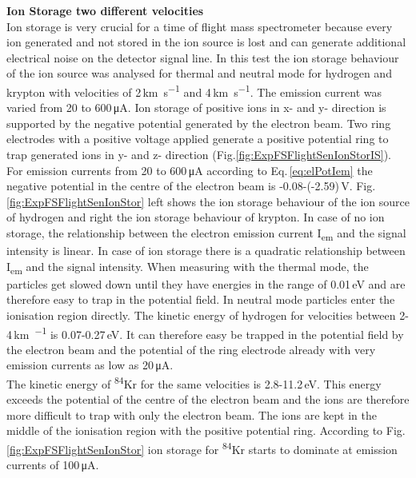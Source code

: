 		\textbf{Ion Storage two different velocities}\\ %
		Ion storage is very crucial for a time of flight mass spectrometer because every ion generated and not stored in the ion source is lost and can generate additional electrical noise on the detector signal line. In this test the ion storage behaviour of the ion source was analysed for thermal and neutral mode for hydrogen and krypton with velocities of 2\,\si{\kilo\meter\per\second} and 4\,\si{\kilo\meter\per\second}. The emission current was varied from 20 to 600\,\si{\micro\ampere}. Ion storage of positive ions in x- and y- direction is supported by the negative potential generated by the electron beam. Two ring electrodes with a positive voltage applied generate a positive potential ring to trap generated ions in y- and z- direction (Fig.\ref{fig:ExpFSFlightSenIonStorIS}). For emission currents from 20 to 600\,\si{\micro\ampere} according to Eq.\,\eqref{eq:elPotIem} the negative potential in the centre of the electron beam is -0.08-(-2.59)\,\si{\volt}. Fig.\ref{fig:ExpFSFlightSenIonStor} left shows the ion storage behaviour of the ion source of hydrogen and right the ion storage behaviour of krypton. In case of no ion storage, the relationship between the electron emission current I\textsubscript{em} and the signal intensity is linear. In case of ion storage there is a quadratic relationship between I\textsubscript{em} and the signal intensity. When measuring with the thermal mode, the particles get slowed down until they have energies in the range of 0.01\,\si{\electronvolt} and are therefore easy to trap in the potential field. In neutral mode particles enter the ionisation region directly. The kinetic energy of hydrogen for velocities between 2-4\,\si{\kilo\metre\per\sec} is 0.07-0.27\,\si{\electronvolt}. It can therefore easy be trapped in the potential field by the electron beam and the potential of the ring electrode already with very emission currents as low as 20\,\si{\micro\ampere}.\\
		The kinetic energy of \textsuperscript{84}Kr for the same velocities is 2.8-11.2\,\si{\electronvolt}. This energy exceeds the potential of the centre of the electron beam and the ions are therefore more difficult to trap with only the electron beam. The ions are kept in the middle of the ionisation region with the positive potential ring. According to Fig.\,\ref{fig:ExpFSFlightSenIonStor} ion storage for \textsuperscript{84}Kr starts to dominate at emission currents of 100\,\si{\micro\ampere}.
